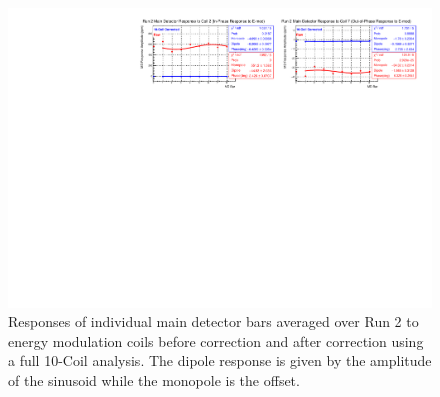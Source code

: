 \begin{landscape}
\begin{figure}[!ht]
\begin{center}
\includegraphics[width=9in]{./Pictures/Run2_E_dipole10-Coil.pdf}
\caption{\label{fig:Run2_10coil_Edipoles_app}Responses of individual main detector bars averaged over Run 2 to energy modulation coils before correction and after correction using a full 10-Coil analysis. The dipole response is given by the amplitude of the sinusoid while the monopole is the offset.}
\end{center}
\end{figure}


\end{landscape}
